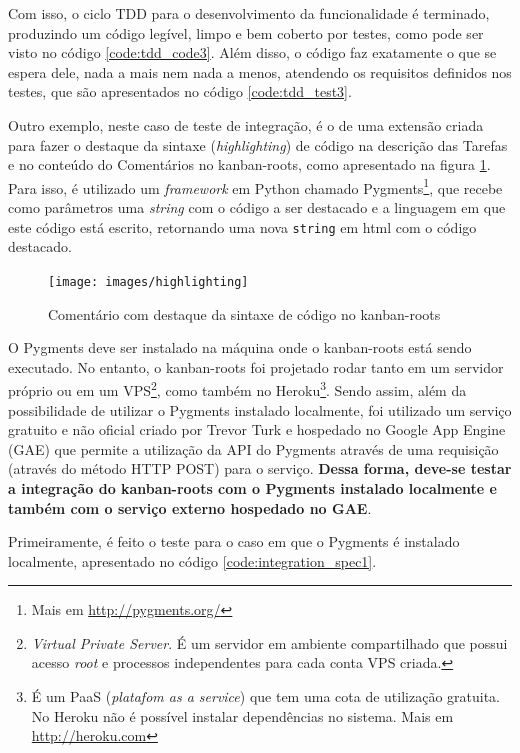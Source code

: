 Com isso, o ciclo TDD para o desenvolvimento da funcionalidade é terminado, produzindo um código legível, limpo e bem coberto por testes, como pode ser visto no código \ref{code:tdd_code3}. Além disso, o código faz exatamente o que se espera dele, nada a mais nem nada a menos, atendendo os requisitos definidos nos testes, que são apresentados no código \ref{code:tdd_test3}.

Outro exemplo, neste caso de teste de integração, é o de uma extensão criada para fazer o destaque da sintaxe (\textit{highlighting}) de código na descrição das Tarefas e no conteúdo do Comentários no kanban-roots, como apresentado na figura \ref{img:highlighting}. Para isso, é utilizado um \textit{framework} em Python chamado Pygments\footnote{ Mais em \url{http://pygments.org/}}, que recebe como parâmetros uma \textit{string} com o código a ser destacado e a linguagem em que este código está escrito, retornando uma nova \texttt{string} em html com o código destacado.

\begin{figure}[h]
  \center
  \caption{Comentário com destaque da sintaxe de código no kanban-roots}
  \texttt{[image: images/highlighting]}
  \label{img:highlighting}
\end{figure}

O Pygments deve ser instalado na máquina onde o kanban-roots está sendo executado. No entanto, o kanban-roots foi projetado rodar tanto em um servidor próprio ou em um VPS\footnote{ \textit{Virtual Private Server}. É um servidor em ambiente compartilhado que possui acesso \textit{root} e processos independentes para cada conta VPS criada.}, como também no Heroku\footnote{ É um PaaS (\textit{platafom as a service}) que tem uma cota de utilização gratuita. No Heroku não é possível instalar dependências no sistema. Mais em \url{http://heroku.com}}. Sendo assim, além da possibilidade de utilizar o Pygments instalado localmente, foi utilizado um serviço gratuito e não oficial criado por Trevor Turk e hospedado no Google App Engine (GAE) que permite a utilização da API  do Pygments através de uma requisição (através do método HTTP POST) para o serviço. \textbf{Dessa forma, deve-se testar a integração do kanban-roots com o Pygments instalado localmente e também com o serviço externo hospedado no GAE}.

Primeiramente, é feito o teste para o caso em que o Pygments é instalado localmente, apresentado no código \ref{code:integration_spec1}.

